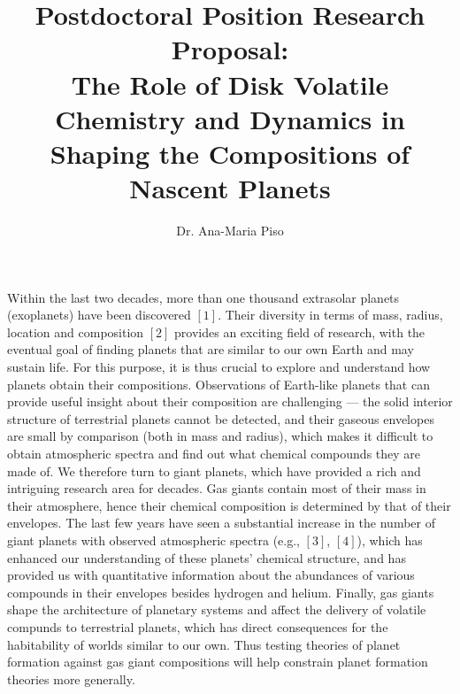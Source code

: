 \documentclass[12pt, letterpaper]{article}
\date{}
\title{\Large Postdoctoral Position Research Proposal: \\
The Role of Disk Volatile Chemistry and Dynamics in Shaping the Compositions of Nascent Planets\vspace{-2ex}}
\author{Dr. Ana-Maria Piso \vspace{-2ex}}
\begin{document}
\maketitle


\vspace{-1.5cm}


Within the last two decades, more than one thousand extrasolar planets (exoplanets) have been discovered $[1]$. Their diversity in terms of mass, radius, location and composition $[2]$ provides an exciting field of research, with the eventual goal of finding planets that are similar to our own Earth and may sustain life. For this purpose, it is thus crucial to explore and understand how planets obtain their compositions. Observations of Earth-like planets that can provide useful insight about their composition are challenging --- the solid interior structure of terrestrial planets cannot be detected, and their gaseous envelopes are small by comparison (both in mass and radius), which makes it difficult to obtain atmospheric spectra and find out what chemical compounds they are made of. We therefore turn to giant planets, which have provided a rich and intriguing research area for decades. Gas giants contain most of their mass in their atmosphere, hence their chemical composition is determined by that of their envelopes. The last few years have seen a substantial increase in the number of giant planets with observed atmospheric spectra (e.g., $[3]$, $[4]$), which has enhanced our understanding of these planets' chemical structure, and has provided us with quantitative information about the abundances of various compounds in their envelopes besides hydrogen and helium. Finally, gas giants shape the architecture of planetary systems and affect the delivery of volatile compunds to terrestrial planets, which has direct consequences for the habitability of worlds similar to our own. Thus testing theories of planet formation against gas giant compositions will help constrain planet formation theories more generally.     
\end{document}
